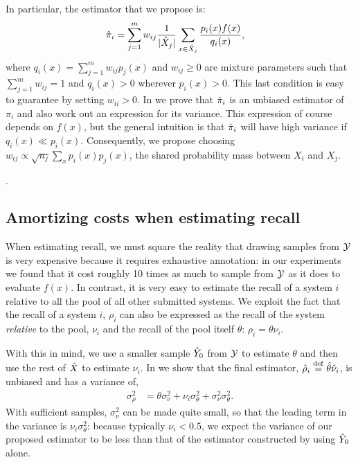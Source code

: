 In particular, the estimator that we propose is:
\begin{align*}
  {\hat{\pi}}_i &= \sum_{j=1}^m w_{ij} \frac{1}{|{\hat{X}}_j|} \sum_{x \in {\hat{X}}_j} \frac{p_i(x) f(x)}{q_i(x)},
\end{align*}
where $q_i(x) = \sum_{j=1}^m w_{ij} p_j(x)$ and $w_{ij} \ge 0$ are mixture parameters such that $\sum_{j=1}^m w_{ij} = 1$ and $q_i(x) > 0$ wherever $p_i(x) > 0$.
This last condition is easy to guarantee by setting $w_{ii} > 0$.
In  we prove that ${\hat{\pi}}_i$ is an unbiased estimator of $\pi_i$ and also work out an expression for its variance. 
This expression of course depends on $f(x)$, but the general intuition is that 
${\hat{\pi}}_i$ will have high variance if $q_i(x) \ll p_i(x)$.
Consequently, we propose choosing $w_{ij} \propto \sqrt{n_j} \sum_{x} p_i(x) p_j(x)$, the shared probability mass between $X_i$ and $X_j$.

.

\subsection{Amortizing costs when estimating recall}
When estimating recall, we must square the reality that drawing samples from $\mathcal{Y}$ is very expensive because it requires exhaustive annotation: in our experiments we found that it cost roughly 10 times as much to sample from $\mathcal{Y}$ as it does to evaluate $f(x)$.
In contrast, it is very easy to estimate the recall of a system $i$ relative to all the pool of all other submitted systems.
We exploit the fact that the recall of a system $i$, $\rho_i$ can also be expressed as the recall of the system \textit{relative} to the pool, $\nu_i$ and the recall of the pool itself $\theta$: $\rho_i = \theta \nu_i$.

With this in mind, we use a smaller sample ${\hat{Y}}_0$ from $\mathcal{Y}$ to estimate $\theta$ and then use the rest of ${\hat{X}}$ to estimate $\nu_i$.
In  we show that the final estimator, ${\hat{\rho}}_i \stackrel{\rm def}{=} {\hat{\theta}} {\hat{\nu}}_i$, is unbiased and has a variance of,
\begin{align*}
  \sigma^2_\rho &= \theta \sigma^2_\nu + \nu_i \sigma^2_\theta + \sigma^2_\nu \sigma^2_\theta.
\end{align*}
With sufficient samples, $\sigma^2_\nu$ can be made quite small, so that the leading term in the variance is $\nu_i \sigma^2_\theta$: because typically $\nu_i < 0.5$, we expect the variance of our proposed estimator to be less than that of the estimator constructed by using ${\hat{Y}}_0$ alone.

